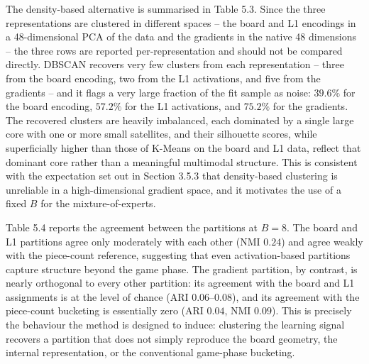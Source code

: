 The density-based alternative is summarised in Table 5.3. Since the three representations are clustered in different spaces -- the board and L1 encodings in a 48-dimensional PCA of the data and the gradients in the native 48 dimensions -- the three rows are reported per-representation and should not be compared directly. DBSCAN recovers very few clusters from each representation -- three from the board encoding, two from the L1 activations, and five from the gradients -- and it flags a very large fraction of the fit sample as noise: $39.6\%$ for the board encoding, $57.2\%$ for the L1 activations, and $75.2\%$ for the gradients. The recovered clusters are heavily imbalanced, each dominated by a single large core with one or more small satellites, and their silhouette scores, while superficially higher than those of K-Means on the board and L1 data, reflect that dominant core rather than a meaningful multimodal structure. This is consistent with the expectation set out in Section 3.5.3 that density-based clustering is unreliable in a high-dimensional gradient space, and it motivates the use of a fixed $B$ for the mixture-of-experts.

\begin{table}[H]
\centering
\small
{}
\caption{DBSCAN results, fitted on a $100\,000$-point subsample with \texttt{min\_samples}$=80$ and $\varepsilon$ selected on a quantile grid. The board and L1 runs are fit in a 48-dimensional PCA of the data, the gradient run in the native 48 dimensions, so the rows are not directly comparable across representations. Bucket sizes are the cluster shares of the full one-million-position assignment; the noise column gives the fraction of the $100\,000$-point fit flagged as noise.}
\label{tab:5.3}
\end{table}

Table 5.4 reports the agreement between the partitions at $B=8$. The board and L1 partitions agree only moderately with each other (NMI $0.24$) and agree weakly with the piece-count reference, suggesting that even activation-based partitions capture structure beyond the game phase. The gradient partition, by contrast, is nearly orthogonal to every other partition: its agreement with the board and L1 assignments is at the level of chance (ARI $0.06$--$0.08$), and its agreement with the piece-count bucketing is essentially zero (ARI $0.04$, NMI $0.09$). This is precisely the behaviour the method is designed to induce: clustering the learning signal recovers a partition that does not simply reproduce the board geometry, the internal representation, or the conventional game-phase bucketing.

